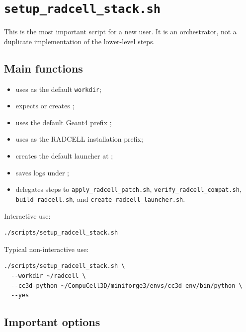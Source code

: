 \documentclass[11pt,a4paper,twoside,pdftex]{refrep}
\begin{document}
\section{\texttt{setup\_radcell\_stack.sh}}

This is the most important script for a new user. It is an orchestrator, not a duplicate implementation of the lower-level steps.

\subsection{Main functions}

\begin{itemize}
  \item uses  as the default \texttt{workdir};
  \item expects or creates ;
  \item uses the default Geant4 prefix ;
  \item uses  as the RADCELL installation prefix;
  \item creates the default launcher at ;
  \item saves logs under ;
  \item delegates steps to \texttt{apply\_radcell\_patch.sh}, \texttt{verify\_radcell\_compat.sh}, \texttt{build\_radcell.sh}, and \texttt{create\_radcell\_launcher.sh}.
\end{itemize}

Interactive use:

\begin{lstlisting}
./scripts/setup_radcell_stack.sh
\end{lstlisting}

Typical non-interactive use:

\begin{lstlisting}
./scripts/setup_radcell_stack.sh \
  --workdir ~/radcell \
  --cc3d-python ~/CompuCell3D/miniforge3/envs/cc3d_env/bin/python \
  --yes
\end{lstlisting}

\subsection{Important options}
\end{document}
